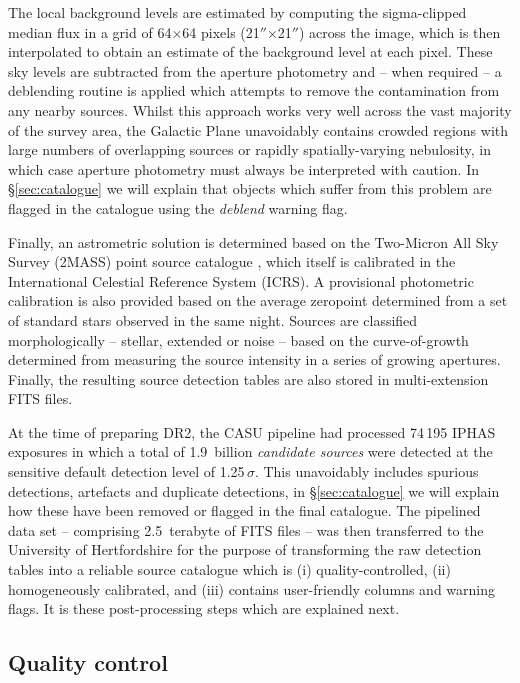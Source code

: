 \documentclass[useAMS,usenatbib]{mn2e}
\def\arcsec{$''$}
\begin{document}
The local background levels are estimated 
by computing the sigma-clipped median
flux in a grid of 64$\times$64 pixels (21\arcsec$\times$21\arcsec)
across the image,
which is then interpolated to obtain an estimate 
of the background level at each pixel.
These sky levels are subtracted from the aperture photometry and
-- when required --
a deblending routine is applied which attempts to remove
the contamination from any nearby sources.
Whilst this approach works very well 
across the vast majority of the survey area,
the Galactic Plane unavoidably contains crowded regions 
with large numbers of overlapping sources
or rapidly spatially-varying nebulosity,
in which case aperture photometry must always be interpreted 
with caution.
In \S\ref{sec:catalogue} we will explain that objects
which suffer from this problem 
are flagged in the catalogue using the \emph{deblend} warning flag.

Finally, an astrometric solution is determined
based on the Two-Micron All Sky Survey (2MASS) point source catalogue \citep{Skrutskie2006},
which itself is calibrated 
in the International Celestial Reference System (ICRS).
A provisional photometric calibration is also provided 
based on the average zeropoint
determined from a set of standard stars observed in the same night.
Sources are classified morphologically
-- stellar, extended or noise --
based on the curve-of-growth determined
from measuring the source intensity in a series of growing apertures.
Finally, the resulting source detection tables are also stored 
in multi-extension FITS files.

At the time of preparing DR2,
the CASU pipeline had processed
74\,195 IPHAS exposures 
in which a total of 1.9~billion \emph{candidate sources} were detected 
at the sensitive default detection level of 1.25\,$\sigma$.
This unavoidably includes spurious detections, artefacts and
duplicate detections,
in \S\ref{sec:catalogue} we will explain
how these have been removed or flagged in the final catalogue.
The pipelined data set -- comprising 2.5~terabyte of FITS files --
was then transferred to the University of Hertfordshire
for the purpose of transforming the raw
detection tables into a reliable source catalogue which is 
(i) quality-controlled,
(ii) homogeneously calibrated, and 
(iii) contains user-friendly columns and warning flags.
It is these post-processing steps which are explained next.


\subsection{Quality control}
\label{sec:qc}
\end{document}
